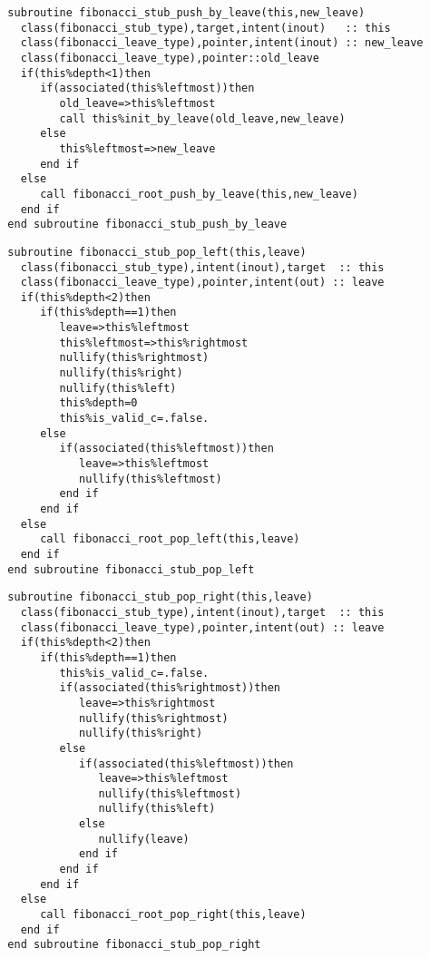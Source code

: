 \begin{Verbatim}
  subroutine fibonacci_stub_push_by_leave(this,new_leave)
    class(fibonacci_stub_type),target,intent(inout)   :: this
    class(fibonacci_leave_type),pointer,intent(inout) :: new_leave
    class(fibonacci_leave_type),pointer::old_leave
    if(this%depth<1)then
       if(associated(this%leftmost))then     
          old_leave=>this%leftmost
          call this%init_by_leave(old_leave,new_leave)
       else
          this%leftmost=>new_leave
       end if
    else
       call fibonacci_root_push_by_leave(this,new_leave)
    end if
  end subroutine fibonacci_stub_push_by_leave
\end{Verbatim}

\begin{Verbatim}
  subroutine fibonacci_stub_pop_left(this,leave)
    class(fibonacci_stub_type),intent(inout),target  :: this
    class(fibonacci_leave_type),pointer,intent(out) :: leave
    if(this%depth<2)then
       if(this%depth==1)then
          leave=>this%leftmost
          this%leftmost=>this%rightmost
          nullify(this%rightmost)
          nullify(this%right)
          nullify(this%left)
          this%depth=0
          this%is_valid_c=.false.
       else
          if(associated(this%leftmost))then
             leave=>this%leftmost
             nullify(this%leftmost)
          end if
       end if
    else
       call fibonacci_root_pop_left(this,leave)
    end if
  end subroutine fibonacci_stub_pop_left
\end{Verbatim}

\begin{Verbatim}
  subroutine fibonacci_stub_pop_right(this,leave)
    class(fibonacci_stub_type),intent(inout),target  :: this
    class(fibonacci_leave_type),pointer,intent(out) :: leave
    if(this%depth<2)then
       if(this%depth==1)then
          this%is_valid_c=.false.
          if(associated(this%rightmost))then
             leave=>this%rightmost
             nullify(this%rightmost)
             nullify(this%right)
          else
             if(associated(this%leftmost))then
                leave=>this%leftmost
                nullify(this%leftmost)
                nullify(this%left)
             else
                nullify(leave)
             end if
          end if
       end if
    else
       call fibonacci_root_pop_right(this,leave)
    end if
  end subroutine fibonacci_stub_pop_right
\end{Verbatim}

